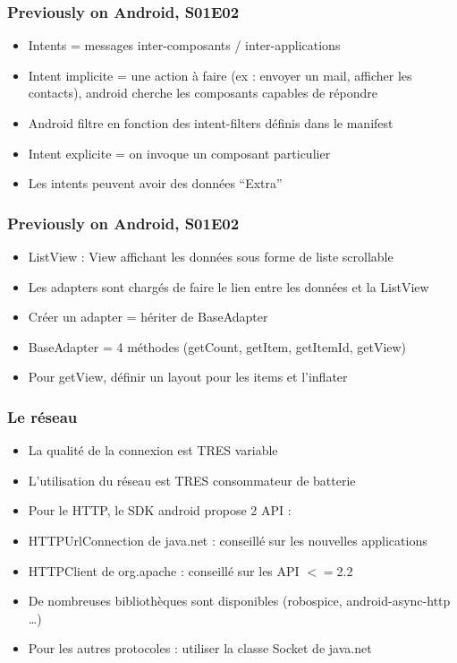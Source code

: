 \documentclass{beamer}
\begin{document}
\begin{frame}[fragile]
\frametitle{Previously on Android, S01E02}
\begin{itemize}
  \item Intents = messages inter-composants / inter-applications
  \item Intent implicite = une action à faire (ex : envoyer un mail, afficher
  les contacts), android cherche les composants capables de répondre
  \item Android filtre en fonction des intent-filters définis dans le manifest
  \item Intent explicite = on invoque un composant particulier
  \item Les intents peuvent avoir des données ``Extra''
\end{itemize}
\end{frame}
\begin{frame}[fragile]
\frametitle{Previously on Android, S01E02}
\begin{itemize}
  \item ListView : View affichant les données sous forme de liste scrollable
  \item Les adapters sont chargés de faire le lien entre les données et la
  ListView
  \item Créer un adapter = hériter de BaseAdapter
  \item BaseAdapter = 4 méthodes (getCount, getItem, getItemId, getView)
  \item Pour getView, définir un layout pour les items et l'inflater 
\end{itemize}
\end{frame}
\begin{frame}[fragile]
\frametitle{Le réseau}
\begin{itemize}
  \item La qualité de la connexion est TRES variable
  \item L'utilisation du réseau est TRES consommateur de batterie 
  \item Pour le HTTP, le SDK android propose 2 API :
  \item HTTPUrlConnection de java.net : conseillé sur les nouvelles applications
  \item HTTPClient de org.apache : conseillé sur les API $<=$2.2
  \item De nombreuses bibliothèques sont disponibles (robospice, android-async-http \ldots)
  \item Pour les autres protocoles : utiliser la classe Socket de java.net
\end{itemize}
\end{frame}
\end{document}
